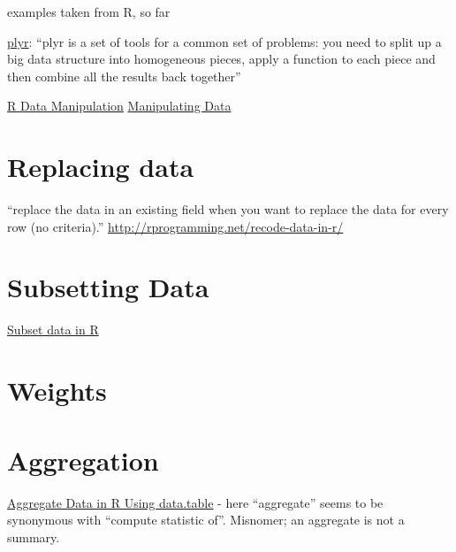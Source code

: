 \begin{remark}
  examples taken from R, so far
\end{remark}

\href{http://plyr.had.co.nz/}{plyr}: ``plyr is a set of tools for a
common set of problems: you need to split up a big data structure into
homogeneous pieces, apply a function to each piece and then combine
all the results back together''


\href{http://rprogramming.net/r-data-manipulation/}{R Data Manipulation}
\href{http://www.cookbook-r.com/Manipulating\_data/}{Manipulating Data}


\section{Replacing data}
\label{sect:datareplacement}

``replace the data in an existing field when you want to replace the data for every row (no criteria).'' \url{http://rprogramming.net/recode-data-in-r/}

\section{Subsetting Data}
\label{sect:datasubsetting}

\href{http://rprogramming.net/subset-data-in-r/}{Subset data in R}

\section{Weights}
\label{sect:dataweighting}

\section{Aggregation}
\label{sect:dataaggregate}

\href{http://rprogramming.net/aggregate-data-in-r-using-data-table/}{Aggregate
  Data in R Using data.table} - here ``aggregate'' seems to be
synonymous with ``compute statistic of''.  Misnomer; an aggregate is not a summary.

